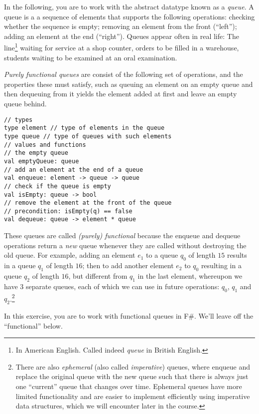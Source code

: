 In the following, you are to work with the abstract datatype known as a \emph{queue}. A queue is a
a sequence of elements that supports the following operations: checking whether the sequence is empty; removing an element from the front (``left''); adding an element at the end (``right'').  Queues appear often in real life: The line\footnote{In American English. Called indeed \emph{queue} in British English.} waiting for service at a shop counter, orders to be filled in a warehouse, students waiting to be examined at an oral examination. 

\emph{Purely functional queues} are consist of the following set of operations, and the properties these must satisfy, such as queuing an element on an empty queue and then dequeuing from it yields the element added at first and leave an empty queue behind.
\begin{lstlisting}
// types
type element // type of elements in the queue
type queue // type of queues with such elements
// values and functions
// the empty queue
val emptyQueue: queue 
// add an element at the end of a queue
val enqueue: element -> queue -> queue
// check if the queue is empty
val isEmpty: queue -> bool
// remove the element at the front of the queue
// precondition: isEmpty(q) == false
val dequeue: queue -> element * queue
\end{lstlisting}
These queues are called \emph{(purely) functional} because the enqueue and dequeue operations return a \emph{new} queue whenever they are called without destroying the old queue. For example, adding an element $e_1$ to a queue $q_0$ of length $15$ results in a queue $q_1$ of length $16$; then to add another element $e_2$ to $q_0$ resulting in a queue $q_2$ of length $16$, but different from $q_1$ in the last element, whereupon we have 3 separate queues, each of which we can use in future operations: $q_0$, $q_1$ and $q_2$.\footnote{There are also \emph{ephemeral} (also called \emph{imperative}) queues, where enqueue and replace the original queue with the new queue such that there is always just one ``current'' queue that changes over time.  Ephemeral queues have more limited functionality and are easier to implement efficiently using imperative data structures, which we will encounter later in the course.} 

In this exercise, you are to work with functional queues in F\#.  We'll leave off the ``functional'' below.